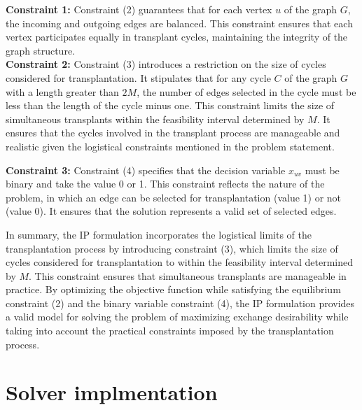 \documentclass{ULBreport}
\begin{document}
\textbf{Constraint 1:}
Constraint (2) guarantees that for each vertex $u$ of the graph $G$, the incoming and outgoing edges are balanced. This constraint ensures that each vertex participates equally in transplant cycles, maintaining the integrity of the graph structure.
\\

\textbf{Constraint 2:}
Constraint (3) introduces a restriction on the size of cycles considered for transplantation. It stipulates that for any cycle $C$ of the graph $G$ with a length greater than $2M$, the number of edges selected in the cycle must be less than the length of the cycle minus one. This constraint limits the size of simultaneous transplants within the feasibility interval determined by $M$. It ensures that the cycles involved in the transplant process are manageable and realistic given the logistical constraints mentioned in the problem statement.

\textbf{Constraint 3:}
Constraint (4) specifies that the decision variable $x_{uv}$ must be binary and take the value 0 or 1. This constraint reflects the nature of the problem, in which an edge can be selected for transplantation (value 1) or not (value 0). It ensures that the solution represents a valid set of selected edges.

In summary, the IP formulation incorporates the logistical limits of the transplantation process by introducing constraint (3), which limits the size of cycles considered for transplantation to within the feasibility interval determined by $M$. This constraint ensures that simultaneous transplants are manageable in practice. By optimizing the objective function while satisfying the equilibrium constraint (2) and the binary variable constraint (4), the IP formulation provides a valid model for solving the problem of maximizing exchange desirability while taking into account the practical constraints imposed by the transplantation process.

\section{Solver implmentation}
\end{document}
